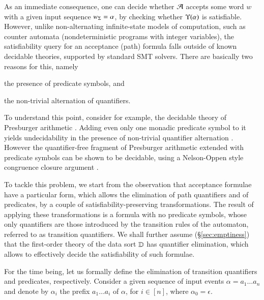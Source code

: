 \documentclass{llncs}
\begin{document}
As an immediate consequence, one can decide whether $\mathcal{A}$ accepts some
word $w$ with a given input sequence ${w}_\Sigma=\alpha$, by checking
whether $\Upsilon({\alpha})$ is satisfiable. However, unlike
non-alternating infinite-state models of computation, such as counter
automata (nondeterministic programs with integer variables), the
satisfiability query for an acceptance (path) formula falls outside of
known decidable theories, supported by standard SMT solvers. There are
basically two reasons for this, namely \begin{inparaenum}[(i)]
\item the presence of predicate symbols, and
\item the non-trivial alternation of quantifiers.
\end{inparaenum}
To understand this point, consider for example, the decidable theory
of Presburger arithmetic \cite{Presburger29}. Adding even only one
monadic predicate symbol to it yields undecidability in the presence
of non-trivial quantifier alternation \cite{Halpern91}. However the
quantifier-free fragment of Presburger arithmetic extended with
predicate symbols can be shown to be decidable, using a Nelson-Oppen
style congruence closure argument \cite{NelsonOppen80}.

To tackle this problem, we start from the observation that acceptance
formulae have a particular form, which allows the elimination of path
quantifiers and of predicates, by a couple of
satisfiability-preserving transformations. The result of applying
these transformations is a formula with no predicate symbols, whose
only quantifiers are those introduced by the transition rules of the
automaton, referred to as transition quantifiers. We shall further
assume (\S\ref{sec:emptiness}) that the first-order theory of the data
sort $\mathbb{D}$ has quantifier elimination, which allows to effectively
decide the satisfiability of such formulae.

For the time being, let us formally define the elimination of
transition quantifiers and predicates, respectively. Consider a given
sequence of input events $\alpha = a_1 \ldots a_n$ and denote by
$\alpha_i$ the prefix $a_1 \ldots a_i$ of $\alpha$, for $i \in [n]$,
where $\alpha_0=\epsilon$.
\end{document}
